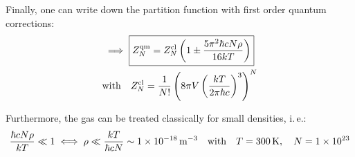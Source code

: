 \documentclass[11pt,a4paper]{scrartcl}
\newcommand{\ie}{i.\,e.}
\begin{document}
Finally, one can write down the partition function with first order quantum
corrections:
\begin{gather*}
    \implies\boxed{%
        Z_{N}^{\mathrm{qm}} = Z_{N}^{\mathrm{cl}}\left(1\pm\frac{5\pi^2\hbar c N\rho}{16kT}\right)
    }\\
    \qq*{with} Z_{N}^{\mathrm{cl}}=\frac{1}{N!}\left(8\pi V\left(\frac{kT}{2\pi\hbar
    c}\right)^3\right)^N
\end{gather*}

Furthermore, the gas can be treated classically for small densities, \ie:
\begin{equation*}
    \frac{\hbar c N\rho}{kT}\ll1
    \iff \rho\ll\frac{kT}{\hbar c N}
    \sim\SI{1e-18}{\per\cubic\metre}
    \qq{with}T=\SI{300}{\kelvin}\qc N=\num{1e23}
\end{equation*}
\end{document}
